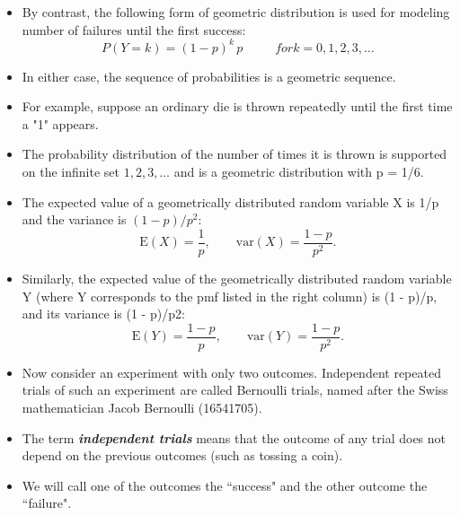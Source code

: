 \documentclass[]{report}
\begin{document}
\begin{itemize}
\item By contrast, the following form of geometric distribution is used for modeling number of failures until the first success:
\[ P(Y=k) = (1 - p)^k\,p\, \phantom{space} for k = 0, 1, 2, 3, \ldots\]

\item
In either case, the sequence of probabilities is a geometric sequence.

\item For example, suppose an ordinary die is thrown repeatedly until the first time a "1" appears. 
\item The probability distribution of the number of times it is thrown is supported on the infinite set ${ 1, 2, 3, \ldots }$ and is a geometric distribution with p = 1/6.

\item

The expected value of a geometrically distributed random variable X is 1/p and the variance is $(1 - p)/p^2$:
\[ \mathrm{E}(X) = \frac{1}{p}, \qquad\mathrm{var}(X) = \frac{1-p}{p^2}. \]
\item Similarly, the expected value of the geometrically distributed random variable Y (where Y corresponds to the pmf listed in the right column) is (1 - p)/p, 
and its variance is (1 - p)/p2:
\[ \mathrm{E}(Y) = \frac{1-p}{p}, \qquad\mathrm{var}(Y) = \frac{1-p}{p^2}.\]

\end{itemize}

\begin{itemize}
\item Now consider an experiment with only two outcomes. Independent repeated trials of such an experiment are
called Bernoulli trials, named after the Swiss mathematician Jacob Bernoulli (16541705). \item The term \textbf{\emph{independent
trials}} means that the outcome of any trial does not depend on the previous outcomes (such as tossing a coin).
\item We will call one of the outcomes the ``success" and the other outcome the ``failure".
\end{itemize}
\end{document}
